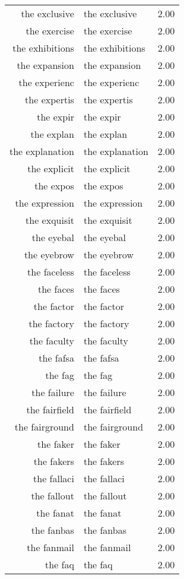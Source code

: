 \begin{table}[ht]
\begin{tabular}{rlr}
  the exclusive & the exclusive & 2.00 \\ 
  the exercise & the exercise & 2.00 \\ 
  the exhibitions & the exhibitions & 2.00 \\ 
  the expansion & the expansion & 2.00 \\ 
  the experienc & the experienc & 2.00 \\ 
  the expertis & the expertis & 2.00 \\ 
  the expir & the expir & 2.00 \\ 
  the explan & the explan & 2.00 \\ 
  the explanation & the explanation & 2.00 \\ 
  the explicit & the explicit & 2.00 \\ 
  the expos & the expos & 2.00 \\ 
  the expression & the expression & 2.00 \\ 
  the exquisit & the exquisit & 2.00 \\ 
  the eyebal & the eyebal & 2.00 \\ 
  the eyebrow & the eyebrow & 2.00 \\ 
  the faceless & the faceless & 2.00 \\ 
  the faces & the faces & 2.00 \\ 
  the factor & the factor & 2.00 \\ 
  the factory & the factory & 2.00 \\ 
  the faculty & the faculty & 2.00 \\ 
  the fafsa & the fafsa & 2.00 \\ 
  the fag & the fag & 2.00 \\ 
  the failure & the failure & 2.00 \\ 
  the fairfield & the fairfield & 2.00 \\ 
  the fairground & the fairground & 2.00 \\ 
  the faker & the faker & 2.00 \\ 
  the fakers & the fakers & 2.00 \\ 
  the fallaci & the fallaci & 2.00 \\ 
  the fallout & the fallout & 2.00 \\ 
  the fanat & the fanat & 2.00 \\ 
  the fanbas & the fanbas & 2.00 \\ 
  the fanmail & the fanmail & 2.00 \\ 
  the faq & the faq & 2.00 \\ 

\end{tabular}
\end{table}
